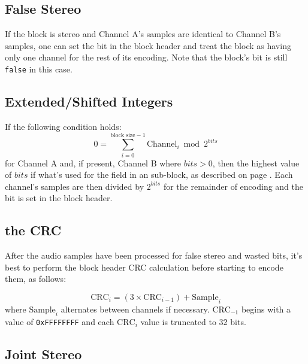 \subsection{False Stereo}

If the block is stereo and Channel A's samples are identical to
Channel B's samples, one can set the  bit in
the block header and treat the block as having only one channel
for the rest of its encoding.
Note that the block's  bit is still \texttt{false}
in this case.

\subsection{Extended/Shifted Integers}
\label{wavpack_encode_extended_integers}
If the following condition holds:
\begin{equation*}
0 = \overset{\text{block size} - 1}{\underset{i = 0}{\sum}}{\text{Channel}_i \bmod{2 ^ {bits}}}
\end{equation*}
for Channel A and, if present, Channel B where $bits > 0$, then the
highest value of $bits$ if what's used for the 
field in an  sub-block, as described
on page \pageref{wavpack_extended_integers}.
Each channel's samples are then divided by $2 ^ {bits}$ for the
remainder of encoding and the  bit
is set in the block header.

\subsection{the CRC}

After the audio samples have been processed for false stereo
and wasted bits, it's best to perform the block header CRC calculation
before starting to encode them, as follows:

\begin{equation*}
\text{CRC}_i = (3 \times \text{CRC}_{i - 1}) + \text{Sample}_i
\end{equation*}
where $\text{Sample}_i$ alternates between channels if necessary.
$\text{CRC}_{-1}$ begins with a value of \texttt{0xFFFFFFFF}
and each $\text{CRC}_i$ value is truncated to 32 bits.

\subsection{Joint Stereo}

